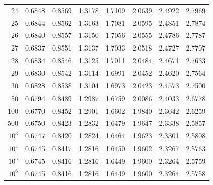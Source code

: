 \begin{figure}[h!]
\begin{center}
\begin{tabular}{|r|rrrrrrr|}
24&0.6848&0.8569&1.3178&1.7109&2.0639&2.4922&2.7969\\
25&0.6844&0.8562&1.3163&1.7081&2.0595&2.4851&2.7874\\
26&0.6840&0.8557&1.3150&1.7056&2.0555&2.4786&2.7787\\
27&0.6837&0.8551&1.3137&1.7033&2.0518&2.4727&2.7707\\
28&0.6834&0.8546&1.3125&1.7011&2.0484&2.4671&2.7633\\
29&0.6830&0.8542&1.3114&1.6991&2.0452&2.4620&2.7564\\
30&0.6828&0.8538&1.3104&1.6973&2.0423&2.4573&2.7500\\
50&0.6794&0.8489&1.2987&1.6759&2.0086&2.4033&2.6778\\
100&0.6770&0.8452&1.2901&1.6602&1.9840&2.3642&2.6259\\
500&0.6750&0.8423&1.2832&1.6479&1.9647&2.3338&2.5857\\
$10^3$&0.6747&0.8420&1.2824&1.6464&1.9623&2.3301&2.5808\\
$10^4$&0.6745&0.8417&1.2816&1.6450&1.9602&2.3267&2.5763\\
$10^5$&0.6745&0.8416&1.2816&1.6449&1.9600&2.3264&2.5759\\
$10^6$&0.6745&0.8416&1.2816&1.6449&1.9600&2.3264&2.5758\\
\hline
\end{tabular}
\end{center}
\end{figure}
